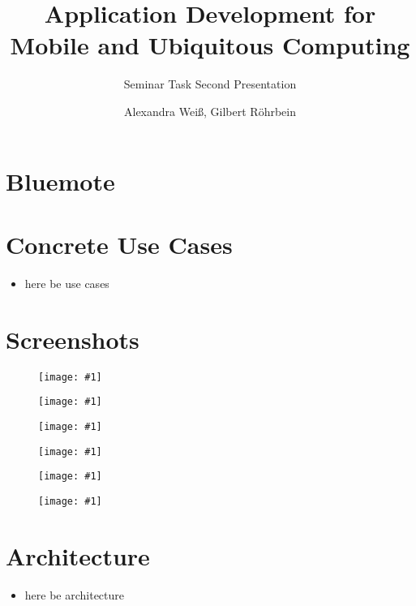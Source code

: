 \documentclass[ddc nogerman]{tudbeamer}
\newcommand{\imageframe}[1]{
    \begin{frame}
        \begin{figure}
            \centering
            \texttt{[image: \#1]}
        \end{figure}
    \end{frame}
}
\begin{document}

\title{Application Development for Mobile and Ubiquitous Computing}
\subtitle{Seminar Task Second Presentation}
\author{Alexandra Weiß, Gilbert Röhrbein}

\maketitle

\section{Bluemote}
\begin{frame}
\end{frame}

\section{Concrete Use Cases}
\begin{frame}
    \begin{itemize}
        \item here be use cases

    \end{itemize}
\end{frame}

\section{Screenshots}
\imageframe{img/btactivate.png}
\imageframe{img/btauth.png}
\imageframe{img/choosedevice.png}
\imageframe{img/choosefunction.png}
\imageframe{img/presentation.png}
\imageframe{img/vlc.png}

\section{Architecture}
\begin{frame}
    \begin{itemize}
        \item here be architecture
    \end{itemize}
\end{frame}
\end{document}
